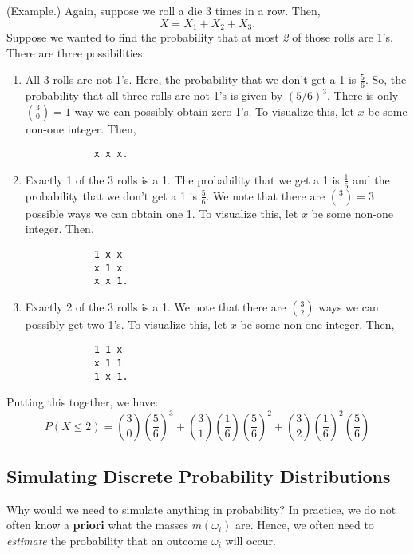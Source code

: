 \documentclass[letterpaper]{article}
\begin{document}
\begin{mdframed}[]
    (Example.) Again, suppose we roll a die 3 times in a row. Then, 
    \[X = X_1 + X_2 + X_3.\]
    Suppose we wanted to find the probability that at most \emph{2} of those rolls are 1's. There are three possibilities: 
    \begin{enumerate}[\hspace{0.5cm}(a)]
        \item All 3 rolls are not 1's. Here, the probability that we don't get a 1 is $\frac{5}{6}$. So, the probability that all three rolls are not 1's is given by $(5 / 6)^3$. There is only $\binom{3}{0} = 1$ way we can possibly obtain zero 1's. To visualize this, let $x$ be some non-one integer. Then,
        \begin{verbatim}
            x x x.\end{verbatim}
        \item Exactly 1 of the 3 rolls is a 1. The probability that we get a 1 is $\frac{1}{6}$ and the probability that we don't get a 1 is $\frac{5}{6}$. We note that there are $\binom{3}{1} = 3$ possible ways we can obtain one 1. To visualize this, let $x$ be some non-one integer. Then,
        \begin{verbatim}
            1 x x
            x 1 x
            x x 1.\end{verbatim}
        \item Exactly 2 of the 3 rolls is a 1. We note that there are $\binom{3}{2}$ ways we can possibly get two 1's.  To visualize this, let $x$ be some non-one integer. Then,
        \begin{verbatim}
            1 1 x
            x 1 1
            1 x 1.\end{verbatim}
    \end{enumerate}
    Putting this together, we have: 
    \[P(X \leq 2) = \binom{3}{0} \left(\frac{5}{6}\right)^3 + \binom{3}{1} \left(\frac{1}{6}\right) \left(\frac{5}{6}\right)^2 + \binom{3}{2}\left(\frac{1}{6}\right)^2 \left(\frac{5}{6}\right)\]
\end{mdframed}

\subsection{Simulating Discrete Probability Distributions}
Why would we need to simulate anything in probability? In practice, we do not often know a \textbf{priori} what the masses $m(\omega_i)$ are. Hence, we often need to \emph{estimate} the probability that an outcome $\omega_i$ will occur.
\end{document}
